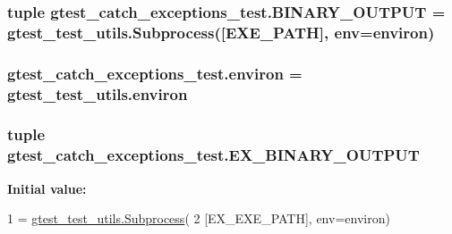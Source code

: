 \subsubsection[{B\+I\+N\+A\+R\+Y\+\_\+\+O\+U\+T\+P\+U\+T}]{\setlength{\rightskip}{0pt plus 5cm}tuple gtest\+\_\+catch\+\_\+exceptions\+\_\+test.\+B\+I\+N\+A\+R\+Y\+\_\+\+O\+U\+T\+P\+U\+T = {\bf gtest\+\_\+test\+\_\+utils.\+Subprocess}(\mbox{[}{\bf E\+X\+E\+\_\+\+P\+A\+T\+H}\mbox{]}, env={\bf environ})}\label{namespacegtest__catch__exceptions__test_a0116f4bc5b12d5f2edf7f0aa5ebdd121}
\hypertarget{namespacegtest__catch__exceptions__test_ae51b794c28e667016c180f1b3fc85292}{}
\subsubsection[{environ}]{\setlength{\rightskip}{0pt plus 5cm}gtest\+\_\+catch\+\_\+exceptions\+\_\+test.\+environ = gtest\+\_\+test\+\_\+utils.\+environ}\label{namespacegtest__catch__exceptions__test_ae51b794c28e667016c180f1b3fc85292}
\hypertarget{namespacegtest__catch__exceptions__test_a890b7d8de84d44cf4cd776663654489a}{}
\subsubsection[{E\+X\+\_\+\+B\+I\+N\+A\+R\+Y\+\_\+\+O\+U\+T\+P\+U\+T}]{\setlength{\rightskip}{0pt plus 5cm}tuple gtest\+\_\+catch\+\_\+exceptions\+\_\+test.\+E\+X\+\_\+\+B\+I\+N\+A\+R\+Y\+\_\+\+O\+U\+T\+P\+U\+T}\label{namespacegtest__catch__exceptions__test_a890b7d8de84d44cf4cd776663654489a}
{\bfseries Initial value\+:}
\begin{DoxyCode}
1 = \hyperlink{classgtest__test__utils_1_1_subprocess}{gtest\_test\_utils.Subprocess}(
2     [EX\_EXE\_PATH], env=environ)
\end{DoxyCode}
\hypertarget{namespacegtest__catch__exceptions__test_a4789e6b786fb431c8f4e205ac93782b5}{}
